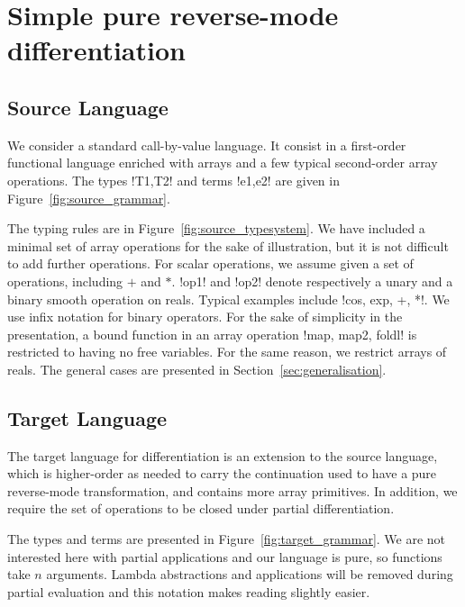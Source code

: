 \section{Simple pure reverse-mode differentiation}
\label{sec:simplediff}

\subsection{Source Language}

\label{sub:sourcelang}

We consider a standard call-by-value language. 
It consist in a first-order functional language enriched with arrays and a few typical second-order array operations. 
The types !T1,T2! and terms !e1,e2! are given in Figure~\ref{fig:source_grammar}.



The typing rules are in Figure~\ref{fig:source_typesystem}. We have included a minimal set of array operations for the sake of illustration, 
but it is not difficult to add further operations. 
For scalar operations, we assume given a set of operations, including $+$ and $*$. 
!op1! and !op2! denote respectively a unary and a binary smooth operation on reals. 
Typical examples include !cos, exp, +, *!. 
We use infix notation for binary operators.
For the sake of simplicity in the presentation, a bound function in an array operation !map, map2, foldl! is restricted to having no free variables.
For the same reason, we restrict arrays of reals.
The general cases are presented in Section~\ref{sec:generalisation}.



\subsection{Target Language}

The target language for differentiation is an extension to the source language, 
which is higher-order as needed to carry the continuation used to have a pure reverse-mode transformation, 
and contains more array primitives. In addition, we require the set of operations to be closed under partial differentiation. 

The types and terms are presented in Figure~\ref{fig:target_grammar}.
We are not interested here with partial applications and our language is pure, so functions take $n$ arguments.
Lambda abstractions and applications will be removed during partial evaluation and this notation makes reading slightly easier.

